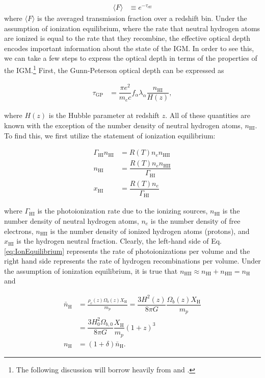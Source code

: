 \begin{align}
\langle F \rangle &\equiv e^{-\tau_{\text{eff}}}
\end{align}
where $\langle F \rangle$ is the averaged transmission fraction over a redshift bin. Under the assumption of ionization equilibrium, where the rate that neutral hydrogen atoms are ionized is equal to the rate that they recombine, the effective optical depth encodes important information about the state of the IGM. In order to see this, we can take a few steps to express the optical depth in terms of the properties of the IGM.\footnote{The following discussion will borrow heavily from \cite{FaucherGiguere:2007jc} and \cite{fan2002evolution}.} First, the Gunn-Peterson optical depth can be expressed as

\begin{align}
\tau_{\text{GP}} &= \dfrac{\pi e^{2}}{m_{e} c} f_{\alpha}\lambda_{\alpha} \dfrac{n_{\text{HI}}}{H(z)}, \label{eq:tauGP}
\end{align}

where $H(z)$ is the Hubble parameter at redshift $z$. All of these quantities are known with the exception of the number density of neutral hydrogen atoms, $n_{\text{HI}}$. To find this, we first utilize the statement of ionization equilibrium:

\begin{align}
\Gamma_{\text{HI}} n_{\text{HI}} &= R(T)n_{e}n_{\text{HII}} \label{eq:IonEquilibrium} \\
n_{\text{HI}} &= \dfrac{R(T) n_{e} n_{\text{HII}}}{\Gamma_{\text{HI}}} \label{eq:nH}\\
x_{\text{HI}} &= \dfrac{R(T)n_e}{\Gamma_{\text{HI}}} \label{eq:xHI}
\end{align}

where $\Gamma_{\text{HI}}$ is the photoionization rate due to the ionizing sources, $n_{\text{HI}}$ is the number density of neutral hydrogen atoms, $n_{e}$ is the number density of free electrons, $n_{\text{HII}}$ is the number density of ionized hydrogen atoms (protons), and $x_{\text{HI}}$ is the hydrogen neutral fraction. Clearly, the left-hand side of Eq. \ref{eq:IonEquilibrium} represents the rate of photoionizations per volume and the right hand side represents the rate of hydrogen recombinations per volume. Under the assumption of ionization equilibrium, it is true that $n_{\text{HII}} \approx n_{\text{HI}} + n_{\text{HII}} = n_{\text{H}}$ and 

\begin{align}
\bar{n}_{\text{H}} &= \frac{\rho_{c}(z)\Omega_{b}(z)X_{\text{H}}}{m_p} = \dfrac{3H^{2}(z)}{8\pi G} \dfrac{\Omega_{b}(z) X_{\text{H}}}{m_{p}} \\
&= \dfrac{3H_{0}^{2}\Omega_{b,0}}{8\pi G} \dfrac{X_{\text{H}}}{m_p}(1+z)^{3}\\
n_{\text{H}} &= (1+\delta) \bar{n}_{\text{H}}. \label{eq:ntot}
\end{align}

